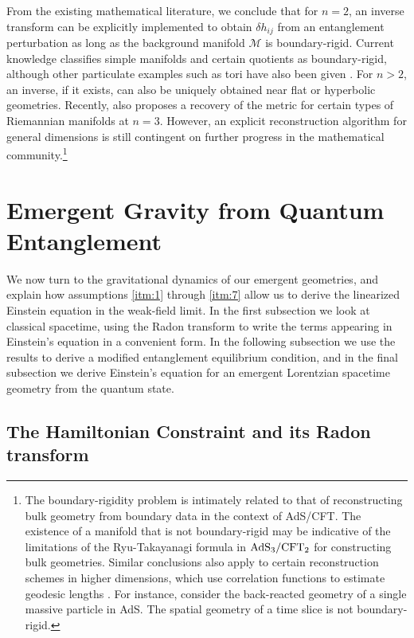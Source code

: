\documentclass[%
12pt,preprint,
nofootinbib,
amsmath,amssymb,
aps,
prd,
showpacs,
superscriptaddress
]{revtex4-2}
\begin{document}
From the existing mathematical literature, we conclude that for $n=2$, an inverse transform can be explicitly implemented to obtain $\delta h_{ij}$ from an entanglement perturbation as long as the background manifold $\mathcal{M}$ is boundary-rigid. Current knowledge classifies simple manifolds and certain quotients  \cite{finitequotient} as boundary-rigid, although other particulate examples such as tori have also been given  \cite{Croke2004,torus2,croke1991}. For $n>2$, an inverse, if it exists, can also be uniquely obtained near flat or hyperbolic geometries. Recently, \cite{Tracey2017} also proposes a recovery of the metric for certain types of Riemannian manifolds at $n=3$. However, an explicit reconstruction algorithm for general dimensions is still contingent on further progress in the mathematical community.\footnote{The boundary-rigidity problem is intimately related to that of reconstructing bulk geometry from boundary data in the context of AdS/CFT. The existence of a manifold that is not boundary-rigid may be indicative of the limitations of the Ryu-Takayanagi formula in $\rm AdS_3/CFT_2$ for constructing bulk geometries. Similar conclusions also apply to certain reconstruction schemes in higher dimensions, which use correlation functions to estimate geodesic lengths  \cite{Porrati:2003na}. For instance, consider the back-reacted geometry of a single massive particle in AdS. The spatial geometry of a time slice is not boundary-rigid.} 



\section{Emergent Gravity from Quantum Entanglement}\label{sec:emergentgravity}

We now turn to the gravitational dynamics of our emergent geometries, and explain how assumptions \ref{itm:1} through \ref{itm:7} allow us to derive the linearized Einstein equation in the weak-field limit.
In the first subsection we look at classical spacetime, using the Radon transform to write the terms appearing in Einstein's equation in a convenient form.
In the following subsection we use the results to derive a modified entanglement equilibrium condition, and in the final
subsection we derive Einstein's equation for an emergent Lorentzian spacetime geometry from the quantum state.

\subsection{The Hamiltonian Constraint and its Radon transform}\label{subsec:MEECHamiltonianConstraint}
\end{document}
